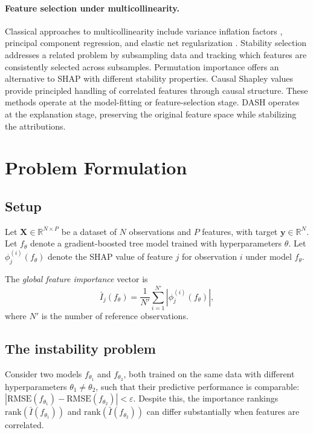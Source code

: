 \documentclass[11pt]{article}
\newcommand{\dash}{\textsc{DASH}}
\begin{document}
\paragraph{Feature selection under multicollinearity.}
Classical approaches to multicollinearity include variance inflation
factors \citep{obrien2007caution}, principal component regression, and
elastic net regularization \citep{zou2005regularization}. Stability
selection \citep{meinshausen2010stability} addresses a related problem
by subsampling data and tracking which features are consistently
selected across subsamples. Permutation importance
\citep{altmann2010permutation} offers an alternative to SHAP with
different stability properties. Causal Shapley values
\citep{heskes2020causal} provide principled handling of correlated
features through causal structure. These methods operate at the
model-fitting or feature-selection stage. \dash{} operates at the
explanation stage, preserving the original feature space while
stabilizing the attributions.


\section{Problem Formulation}
\label{sec:problem}

\subsection{Setup}

Let $\mathbf{X} \in \mathbb{R}^{N \times P}$ be a dataset of $N$
observations and $P$ features, with target $\mathbf{y} \in \mathbb{R}^N$.
Let $f_\theta$ denote a gradient-boosted tree model trained with
hyperparameters $\theta$. Let $\phi_j^{(i)}(f_\theta)$ denote the SHAP
value of feature $j$ for observation $i$ under model $f_\theta$.

The \emph{global feature importance} vector is
\begin{equation}
  \bar{I}_j(f_\theta) = \frac{1}{N'} \sum_{i=1}^{N'} |\phi_j^{(i)}(f_\theta)|,
  \label{eq:global_importance}
\end{equation}
where $N'$ is the number of reference observations.

\subsection{The instability problem}

Consider two models $f_{\theta_1}$ and $f_{\theta_2}$, both trained on the
same data with different hyperparameters $\theta_1 \neq \theta_2$, such
that their predictive performance is comparable:
$|\text{RMSE}(f_{\theta_1}) - \text{RMSE}(f_{\theta_2})| < \varepsilon$.
Despite this, the importance rankings
$\text{rank}(\bar{I}(f_{\theta_1}))$ and
$\text{rank}(\bar{I}(f_{\theta_2}))$ can differ substantially when
features are correlated.
\end{document}
